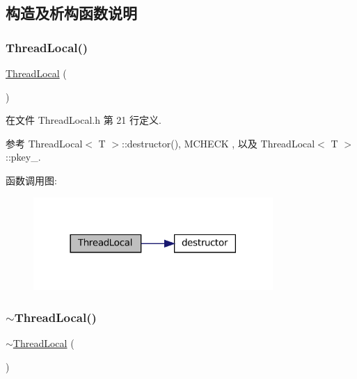 \subsection{构造及析构函数说明}
\mbox{\label{classmuduo_1_1ThreadLocal_a29759b045add7cf2215a0bd2ab2c70db}} 
\subsubsection{\texorpdfstring{Thread\+Local()}{ThreadLocal()}}
{\footnotesize\ttfamily \hyperlink{classmuduo_1_1ThreadLocal}{Thread\+Local} (\begin{DoxyParamCaption}{ }\end{DoxyParamCaption})\hspace{0.3cm}{\ttfamily [inline]}}



在文件 Thread\+Local.\+h 第 21 行定义.



参考 Thread\+Local$<$ T $>$\+::destructor(), M\+C\+H\+E\+CK , 以及 Thread\+Local$<$ T $>$\+::pkey\+\_\+.

函数调用图\+:
\nopagebreak
\begin{figure}[H]
\begin{center}
\leavevmode
\includegraphics[width=258pt]{classmuduo_1_1ThreadLocal_a29759b045add7cf2215a0bd2ab2c70db_cgraph}
\end{center}
\end{figure}
\mbox{\label{classmuduo_1_1ThreadLocal_aa8a52dac4ecfb1abf1db1a6b093cb92e}} 
\subsubsection{\texorpdfstring{$\sim$\+Thread\+Local()}{~ThreadLocal()}}
{\footnotesize\ttfamily $\sim$\hyperlink{classmuduo_1_1ThreadLocal}{Thread\+Local} (\begin{DoxyParamCaption}{ }\end{DoxyParamCaption})\hspace{0.3cm}{\ttfamily [inline]}}



